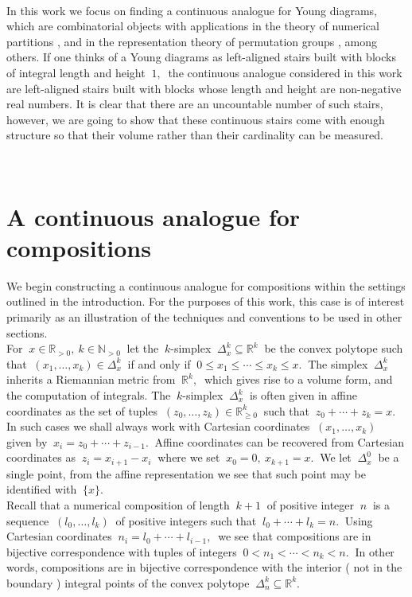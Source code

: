 \documentclass[10pt,leqeq]{article}
\begin{document}
\


In this work we focus on finding a continuous analogue for Young diagrams, which are combinatorial objects with applications in the theory of numerical partitions \cite{ae}, and in the representation theory of permutation groups  \cite{ap}, among others. If one thinks of a Young diagrams as left-aligned stairs built with blocks of integral length and height $\ 1, \ $ the continuous analogue considered in this work are left-aligned stairs built with blocks  whose length and height are non-negative real numbers. It is clear that there are an uncountable number of such stairs, however, we are going to show that these continuous stairs come with enough structure so that their volume rather than their cardinality can be measured.

\

\section{A continuous analogue for compositions}

We begin constructing a continuous analogue for compositions within the settings outlined in the introduction. For the purposes of this work, this case is of interest primarily as an illustration of the techniques and conventions to be used in other sections.\\

For $\ x\in \mathbb{R}_{> 0}, \ k \in  \mathbb{N}_{> 0}\ $ let the $\ k $-simplex $\ \Delta^k_x \subseteq\mathbb{R}^k\ $ be the convex polytope such that $\ (x_1,\dots,x_k) \in \Delta^k_x\ $  
if and only if  $\  0\leq x_1 \leq \cdots \leq x_k \leq x. \ $ 
The simplex $\ \Delta^k_x\ $  inherits a Riemannian metric from $\ \mathbb{R}^k,\ $  which gives rise to a volume form, and the computation of integrals. The $\ k $-simplex $\ \Delta^k_x \ $ is often given in affine coordinates as the set of tuples $\ (z_0,\dots,z_k)\in \mathbb{R}_{\geq 0}^k\ $ such that  $\ z_0+ \cdots + z_k=x .\ $ In such cases we shall always work with Cartesian coordinates $\ (x_1,\dots,x_k)\ $ given by $\ x_i=z_0+ \cdots + z_{i-1}. \ $   
Affine coordinates can be recovered from Cartesian coordinates as $\ z_i= x_{i+1}-x_i \ $ where we set  $\ x_0=0, \  x_{k+1}=x. \ $  We let 
$\ \Delta^0_x \ $ be a single point, from the affine representation we see that such point may be identified with  $\ \{x\}.$\\

Recall \cite{ae} that a numerical composition of length $\ k+1\ $ of positive integer $\  n \ $  is a sequence $\ (l_0,\dots,l_k)\ $ of positive integers such that $\ l_0+ \cdots + l_k=n .\ $ Using Cartesian coordinates 
$\ n_i=l_0+ \cdots + l_{i-1} ,\ $ we see that compositions are in bijective correspondence with  tuples  of integers $\ 0 < n_1 < \cdots < n_k < n.\ $ In other words, compositions are in bijective correspondence with the interior ( not in the boundary ) integral points of  the convex polytope $\ \Delta^k_n \subseteq\mathbb{R}^k. \ $ \\
\end{document}
